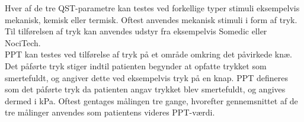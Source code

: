 Hver af de tre QST-parametre kan testes ved forkellige typer stimuli eksempelvis mekanisk, kemisk eller termisk. Oftest anvendes mekanisk stimuli i form af tryk. \citep{Suokas2012} Til tilførelsen af tryk kan anvendes udstyr fra eksempelvis Somedic eller NociTech. \citep{Wylde2015} \citep{Petersen2016} \\
PPT kan testes ved tilførelse af tryk på et område omkring det påvirkede knæ. Det påførte tryk stiger indtil patienten begynder at opfatte trykket som smertefuldt, og angiver dette ved eksempelvis tryk på en knap. PPT defineres som det påførte tryk da patienten angav trykket blev smertefuldt, og angives dermed i kPa. Oftest gentages målingen tre gange, hvorefter gennemsnittet af de tre målinger anvendes som patientens videres PPT-værdi. \citep{Petersen2015b} \citep{Wylde2015}      

      
    